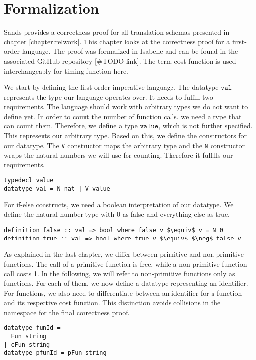 
\chapter{Formalization}\label{chapter:formal}

Sands provides a correctness proof for all translation schemas presented in chapter \ref{chapter:relwork}.
This chapter looks at the correctness proof for a first-order language.
The proof was formalized in Isabelle and can be found in the associated GitHub repository [\#TODO link].
The term cost function is used interchangeably for timing function here.

We start by defining the first-order imperative language.
The datatype $\texttt{val}$ represents the type our language operates over.
It needs to fulfill two requirements.
The language should work with arbitrary types we do not want to define yet.
In order to count the number of function calls, we need a type that can count them.
Therefore, we define a type $\texttt{value}$, which is not further specified.
This represents our arbitrary type.
Based on this, we define the constructors for our datatype.
The $\texttt{V}$ constructor maps the arbitrary type and the $\texttt{N}$ constructor wraps the natural numbers we will use for counting.
Therefore it fulfills our requirements.
\begin{lstlisting}[language=isabelle]
typedecl value
datatype val = N nat | V value
\end{lstlisting}

For if-else constructs, we need a boolean interpretation of our datatype.
We define the natural number type with 0 as false and everything else as true.
\begin{lstlisting}[mathescape=true,language=isabelle]
definition false :: val => bool where false v $\equiv$ v = N 0
definition true :: val => bool where true v $\equiv$ $\neg$ false v
\end{lstlisting}

As explained in the last chapter, we differ between primitive and non-primitive functions.
The call of a primitive function is free, while a non-primitive function call costs 1.
In the following, we will refer to non-primitive functions only as functions.
For each of them, we now define a datatype representing an identifier.
For functions, we also need to differentiate between an identifier for a function and its respective cost function.
This distinction avoids collisions in the namespace for the final correctness proof.
\begin{lstlisting}[language=isabelle]
datatype funId =
  Fun string
| cFun string
datatype pfunId = pFun string
\end{lstlisting}

